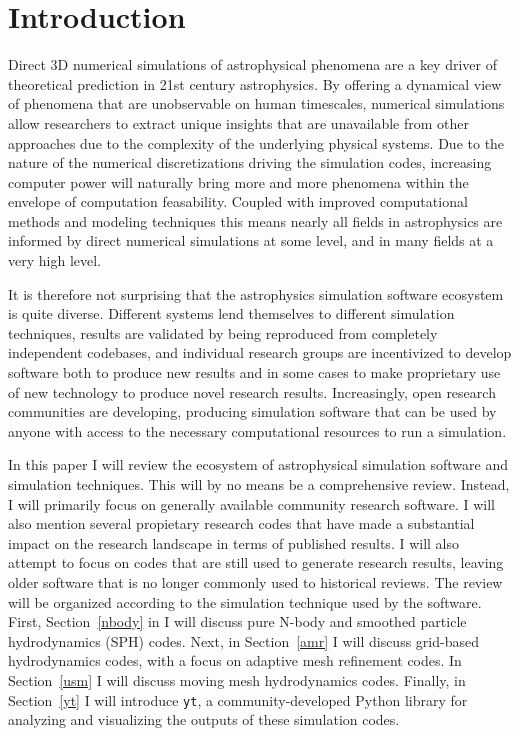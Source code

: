 \documentclass[11pt,twoside]{article}
\newcommand{\yt}{\texttt{yt}}
\begin{document}
\section{Introduction}
Direct 3D numerical simulations of astrophysical phenomena are a key driver of theoretical prediction in 21st century astrophysics. By offering a dynamical view of phenomena that are unobservable on human timescales, numerical simulations allow researchers to extract unique insights that are unavailable from other approaches due to the complexity of the underlying physical systems. Due to the nature of the numerical discretizations driving the simulation codes, increasing computer power will naturally bring more and more phenomena within the envelope of computation feasability. Coupled with improved computational methods and modeling techniques this means nearly all fields in astrophysics are informed by direct numerical simulations at some level, and in many fields at a very high level.

It is therefore not surprising that the astrophysics simulation software ecosystem is quite diverse. Different systems lend themselves to different simulation techniques, results are validated by being reproduced from completely independent codebases, and individual research groups are incentivized to develop software both to produce new results and in some cases to make proprietary use of new technology to produce novel research results. Increasingly, open research communities are developing, producing simulation software that can be used by anyone with access to the necessary computational resources to run a simulation.

In this paper I will review the ecosystem of astrophysical simulation software and simulation techniques. This will by no means be a comprehensive review. Instead, I will primarily focus on generally available community research software. I will also mention several propietary research codes that have made a substantial impact on the research landscape in terms of published results. I will also attempt to focus on codes that are still used to generate research results, leaving older software that is no longer commonly used to historical reviews. The review will be organized according to the simulation technique used by the software. First, Section~\ref{nbody} in I will discuss pure N-body and smoothed particle hydrodynamics (SPH) codes. Next, in Section~\ref{amr} I will discuss grid-based hydrodynamics codes, with a focus on adaptive mesh refinement codes. In Section~\ref{usm} I will discuss moving mesh hydrodynamics codes. Finally, in Section~\ref{yt} I will introduce \yt, a community-developed Python library for analyzing and visualizing the outputs of these simulation codes.
\end{document}
